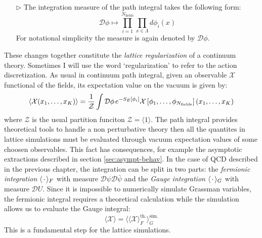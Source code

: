 \documentclass[english, LaM, oneside, noexaminfo]{sapthesis}
\newcommand{\la}{\langle}
\newcommand{\ra}{\rangle}
\begin{document}
\begin{itemize}
    \item [$\triangleright$] The integration measure of the path integral takes the following form:
        \begin{equation*}
            \mathcal{D}\phi \longmapsto \prod_{i=1}^{N_\text{fields}} \prod_{x\in \Lambda} d\phi_i (x)
        \end{equation*}
        For notational simplicity the measure is again denoted by $\mathcal{D}\phi$.
\end{itemize}
These changes together constitute the \textit{lattice regularization} of a continuum theory. 
Sometimes I will use the word `regularization' to refer to the action discretization. 
\newline
As usual in continuum path integral, given an observable $\mathcal{X}$ functional of the fields, its expectation value on the vacuum is given by:
\begin{equation*}
    \la \mathcal{X} (x_1,\dots,x_K) \ra = \frac{1}{\mathcal Z} \int \mathcal{D} \phi \hspace*{0.5mm} e^{-S_E[\phi_i]} \mathcal{X}\left[\phi_1,\dots,\phi_{N_\text{fields}}\right] (x_1,\dots,x_K)
\end{equation*}
where $\mathcal Z$ is the usual partition funciton $\mathcal Z = \la 1 \ra$.
The path integral provides theoretical tools to handle a non perturbative theory then all the quantites in lattice simulations must be evaluated through vacuum expectation values of some choosen observables.
This fact has consequences, for example the asymptotic extractions described in section \ref{sec:asympt-behav}.
\newline
In the case of QCD described in the previous chapter, the integration can be split in two parts: the {\it fermionic integration} $\la \hspace*{0.5mm} \cdot \hspace*{0.5mm} \ra_F$ with measure $\mathcal{D}\psi\mathcal{D}\bar\psi$ and the {\it Gauge integration} $\la \hspace*{0.5mm} \cdot \hspace*{0.5mm} \ra_G$ with measure $\mathcal{D}U$.
Since it is impossible to numerically simulate Grassman variables, the fermionic integral requires a theoretical calculation while the simulation allows us to evaluate the Gauge integral:
\begin{equation*}
    \la \mathcal{X} \ra = \la \la \mathcal{X} \ra_F^\text{th.} \ra_G^\text{sim.}
\end{equation*}
This is a fundamental step for the lattice simulations.
\end{document}
